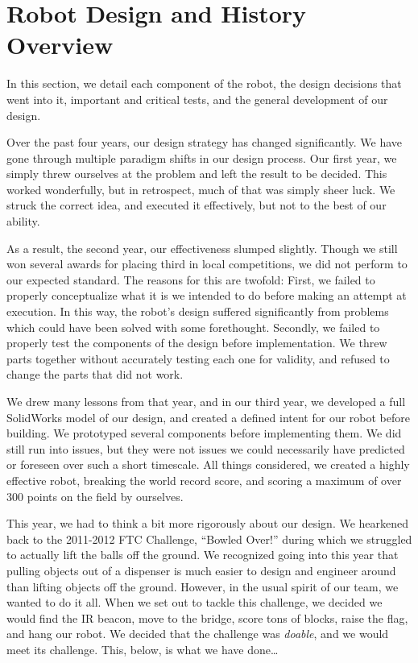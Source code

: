 \section{Robot Design and History Overview}
In this section, we detail each component of the robot, the design decisions that went into it, important and critical tests, and the general development of our design.

Over the past four years, our design strategy has changed significantly. We have gone through multiple paradigm shifts in our design process. Our first year, we simply threw ourselves at the problem and left the result to be decided. This worked wonderfully, but in retrospect, much of that was simply sheer luck. We struck the correct idea, and executed it effectively, but not to the best of our ability. 
	
As a result, the second year, our effectiveness slumped slightly. Though we still won several awards for placing third in local competitions, we did not perform to our expected standard. The reasons for this are twofold: First, we failed to properly conceptualize what it is we intended to do before making an attempt at execution. In this way, the robot's design suffered significantly from problems which could have been solved with some forethought. Secondly, we failed to properly test the components of the design before implementation. We threw parts together without accurately testing each one for validity, and refused to change the parts that did not work.

We drew many lessons from that year, and in our third year, we developed a full SolidWorks model of our design, and created a defined intent for our robot before building. We prototyped several components before implementing them. We did still run into issues, but they were not issues we could necessarily have predicted or foreseen over such a short timescale. All things considered, we created a highly effective robot, breaking the world record score, and scoring a maximum of over 300 points on the field by ourselves.

This year, we had to think a bit more rigorously about our design. We hearkened back to the 2011-2012 FTC Challenge, ``Bowled Over!'' during which we struggled to actually lift the balls off the ground. We recognized going into this year that pulling objects out of a dispenser is much easier to design and engineer around than lifting objects off the ground. However, in the usual spirit of our team, we wanted to do it all. When we set out to tackle this challenge, we decided we would find the IR beacon, move to the bridge, score tons of blocks, raise the flag, and hang our robot. We decided that the challenge was \textit{doable}, and we would meet its challenge. This, below, is what we have done\ldots


